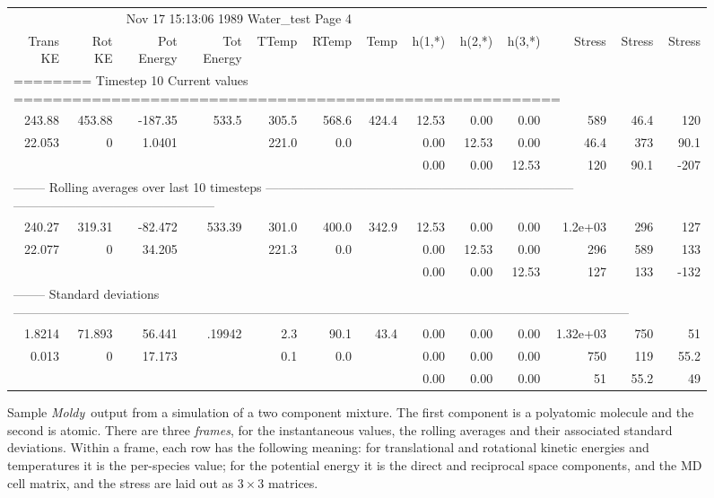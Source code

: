 \documentclass[a4paper,twoside]{report}
\newcommand{\moldy}{\emph{Moldy}}
\begin{document}
\begin{figure}
\tiny
%
\begin{tabular}{rrrrrrrr
@{\hspace{1em}}r@{\hspace{1em}}rr@{\hspace{1em}}r@{\hspace{1em}}r}
\multicolumn{6}{r}{\hfill Nov 17 15:13:06 1989 \hfill Water\_test
\hfill Page 4} & & & & & & &\\
Trans KE & Rot KE & Pot Energy & Tot Energy & TTemp & RTemp & Temp &
h(1,*) & h(2,*) & h(3,*) & Stress & Stress & Stress \\
\multicolumn{13}{l}{======== Timestep 10      Current values
======================================================== } \\
243.88 & 453.88  & -187.35  & 533.5  & 305.5  & 568.6  & 424.4  &
12.53  & 0.00  & 0.00  & 589  & 46.4  & 120 \\
22.053  & 0  & 1.0401 & & 221.0  & 0.0 & & 0.00  & 12.53  & 0.00  & 46.4
& 373  & 90.1 \\
 &  &  &  &  & & &  0.00  & 0.00  & 12.53 & 120  & 90.1  & -207 \\
\multicolumn{13}{l}{-------- Rolling averages over last 10 timesteps
--------------------------------------------------------------------------
------------------------------------------------
} \\
240.27 & 319.31 & -82.472 & 533.39 & 301.0 & 400.0 & 342.9 & 12.53 &
0.00 & 0.00 & 1.2e+03 & 296 & 127 \\
22.077 & 0 & 34.205  & & 221.3 & 0.0 & & 0.00 & 12.53 & 0.00 & 296 &
589 & 133 \\
& & & & & & & 0.00 & 0.00 & 12.53 & 127 & 133 & -132 \\
\multicolumn{13}{l}{-------- Standard deviations
---------------------------------------------------------------------------------------------------------------------------------------------------
} \\
1.8214 & 71.893 & 56.441 &.19942 & 2.3 & 90.1 & 43.4 & 0.00 & 0.00 &
0.00 & 1.32e+03 & 750 & 51 \\
0.013 & 0 & 17.173 & & 0.1 & 0.0 & & 0.00 & 0.00 & 0.00 & 750 & 119 & 55.2 \\
 & & &  &  &  &  & 0.00  & 0.00 & 0.00 & 51 & 55.2 & 49 \\
\end{tabular}
\caption[Sample \moldy\  output.]{Sample \moldy\  output from a simulation 
of a two component mixture.  The first component is a polyatomic
molecule and the second is atomic.  There are three \emph{frames}, for
the instantaneous values, the rolling averages and their associated
standard deviations.  Within a frame, each row has the following
meaning: for translational and rotational kinetic energies and
temperatures it is the per-species value; for the potential energy it
is the direct and reciprocal space components, and the MD cell matrix,
 and the stress are laid out as $3\times 3$ matrices.}
\label{fig:output}
\end{figure}
\end{document}
